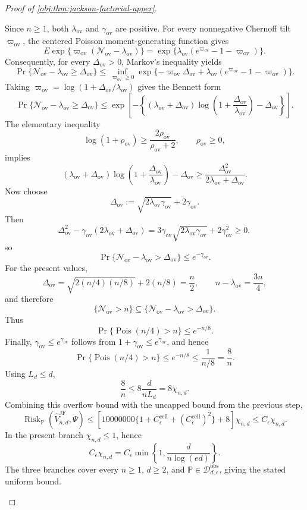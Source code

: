 \begin{proof}[Proof of \cref{obj:thm:jackson-factorial-upper}]
\begin{enumerate}
\[\]
Since \(n\ge1\), both \(\lambda_{\mathrm{ov}}\) and \(\gamma_{\mathrm{ov}}\) are
positive.  For every nonnegative Chernoff tilt \(\varpi_{\mathrm{ov}}\), the
centered Poisson moment-generating function gives
\[
E\exp\{\varpi_{\mathrm{ov}}(\mathcal N_{\mathrm{ov}}-\lambda_{\mathrm{ov}})\}
=
\exp\{\lambda_{\mathrm{ov}}(e^{\varpi_{\mathrm{ov}}}-1-\varpi_{\mathrm{ov}})\}.
\]
Consequently, for every \(\Delta_{\mathrm{ov}}>0\), Markov's inequality yields
\[
\Pr\{\mathcal N_{\mathrm{ov}}-\lambda_{\mathrm{ov}}\ge \Delta_{\mathrm{ov}}\}
\le
\inf_{\varpi_{\mathrm{ov}}\ge0}
\exp\{-\varpi_{\mathrm{ov}}\Delta_{\mathrm{ov}}
+\lambda_{\mathrm{ov}}(e^{\varpi_{\mathrm{ov}}}-1-\varpi_{\mathrm{ov}})\}.
\]
Taking
\(
\varpi_{\mathrm{ov}}
=\log(1+\Delta_{\mathrm{ov}}/\lambda_{\mathrm{ov}})
\)
gives the Bennett form
\[
\Pr\{\mathcal N_{\mathrm{ov}}-\lambda_{\mathrm{ov}}\ge \Delta_{\mathrm{ov}}\}
\le
\exp\left[-\left\{(\lambda_{\mathrm{ov}}+\Delta_{\mathrm{ov}})
\log\left(1+\frac{\Delta_{\mathrm{ov}}}{\lambda_{\mathrm{ov}}}\right)
-\Delta_{\mathrm{ov}}\right\}\right].
\]
The elementary inequality
\[
\log(1+\rho_{\mathrm{ov}})\ge \frac{2\rho_{\mathrm{ov}}}{\rho_{\mathrm{ov}}+2},
\qquad \rho_{\mathrm{ov}}\ge0,
\]
implies
\[
(\lambda_{\mathrm{ov}}+\Delta_{\mathrm{ov}})
\log\left(1+\frac{\Delta_{\mathrm{ov}}}{\lambda_{\mathrm{ov}}}\right)
-\Delta_{\mathrm{ov}}
\ge
\frac{\Delta_{\mathrm{ov}}^2}{2\lambda_{\mathrm{ov}}+\Delta_{\mathrm{ov}}}.
\]
Now choose
\[
\Delta_{\mathrm{ov}}
:=
\sqrt{2\lambda_{\mathrm{ov}}\gamma_{\mathrm{ov}}}+2\gamma_{\mathrm{ov}}.
\]
Then
\[
\Delta_{\mathrm{ov}}^2
-\gamma_{\mathrm{ov}}(2\lambda_{\mathrm{ov}}+\Delta_{\mathrm{ov}})
=
3\gamma_{\mathrm{ov}}\sqrt{2\lambda_{\mathrm{ov}}\gamma_{\mathrm{ov}}}
+2\gamma_{\mathrm{ov}}^2
\ge0,
\]
so
\[
\Pr\{\mathcal N_{\mathrm{ov}}-\lambda_{\mathrm{ov}}>\Delta_{\mathrm{ov}}\}
\le e^{-\gamma_{\mathrm{ov}}}.
\]
For the present values,
\[
\Delta_{\mathrm{ov}}
=\sqrt{2(n/4)(n/8)}+2(n/8)
=\frac n2,
\qquad
n-\lambda_{\mathrm{ov}}=\frac{3n}{4},
\]
and therefore
\[
\{\mathcal N_{\mathrm{ov}}>n\}
\subseteq
\{\mathcal N_{\mathrm{ov}}-\lambda_{\mathrm{ov}}>\Delta_{\mathrm{ov}}\}.
\]
Thus
\[
\Pr\{\operatorname{Pois}(n/4)>n\}
\le e^{-n/8}.
\]
Finally, \(\gamma_{\mathrm{ov}}\le e^{\gamma_{\mathrm{ov}}}\) follows from
\(1+\gamma_{\mathrm{ov}}\le e^{\gamma_{\mathrm{ov}}}\), and hence
\[
\Pr\{\operatorname{Pois}(n/4)>n\}
\le e^{-n/8}
\le \frac{1}{n/8}
=
\frac8n .
\]
Using \(L_d\le d\),
\[
\frac8n\le 8\frac{d}{nL_d}=8\chi_{n,d}.
\]
Combining this overflow bound with the uncapped bound from the previous step,
\[
\operatorname{Risk}_{\mathbb P}
(\widehat V_{n,d}^{\mathrm{JF}},\Psi)
\le
\left[
10000000
\{1+C_{\epsilon}^{\mathrm{cell}}+(C_{\epsilon}^{\mathrm{cell}})^2\}
+8
\right]\chi_{n,d}
\le
C_\epsilon\chi_{n,d}.
\]
In the present branch \(\chi_{n,d}\le1\), hence
\[
C_\epsilon\chi_{n,d}
=
C_\epsilon
\min\left\{1,\frac{d}{n\log(ed)}\right\}.
\]
The three branches cover every \(n\ge1\), \(d\ge2\), and
\(\mathbb P\in\mathcal D_{d,\epsilon}^{\mathrm{obs}}\), giving the stated
uniform bound.
\end{enumerate}
\end{proof}

